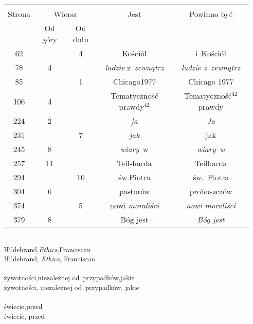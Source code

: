 \documentclass[a4paper,11pt]{article}
\begin{document}


\begin{center}

  \begin{tabular}{|c|c|c|c|c|}
    \hline
    & \multicolumn{2}{c|}{} & & \\
    Strona & \multicolumn{2}{c|}{Wiersz} & Jest
                              & Powinno być \\ \cline{2-3}
    & Od góry & Od dołu & & \\
    \hline
    62  & &  4 & Kościół & i~Kościół \\
    78  &  4 & & \textit{ludzie} z~\textit{zewnątrz}
           & \textit{ludzie z~zewnątrz} \\
    85  & &  1 & Chicago1977 & Chicago 1977 \\
    106 &  4 & & Tematyczność prawdy$^{ 42 }$
           & Tematyczność$^{ 42 }$ prawdy \\
    224 &  2 & & \textit{]a} & \textit{Ja} \\
    231 & &  7 & \textit{jak} & jak \\
    245 &  8 & & \textit{wiary}~w & \textit{wiary~w} \\
    257 & 11 & & Teil-harda & Teilharda \\
    294 & & 10 & św.Piotra & św.~Piotra \\
    304 &  6 & & pastorów & proboszczów \\
    374 & &  5 & nowi \textit{moraliści} & \textit{nowi moraliści} \\
    379 &  8 & & Bóg jest & \textit{Bóg jest} \\
    \hline
  \end{tabular}

\end{center}


\noindent
{} \\
\Jest  Hildebrand,\textit{Ethics},Franciscan \\
\Powin Hildebrand, \textit{Ethics}, Franciscan \\
 \\
\Jest  żywotności,niezależnej od~przypadków,jakie \\
\Powin żywotności, niezależnej od~przypadków, jakie \\
 \\
\Jest  świecie,przed \\
\Powin świecie, przed \\
\end{document}
